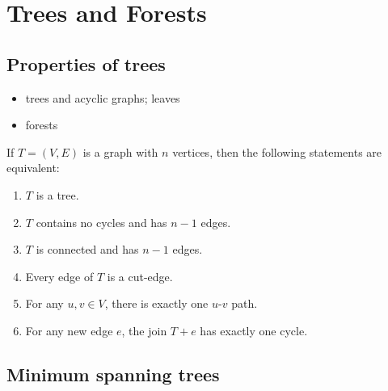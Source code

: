 
\chapter{Trees and Forests}



\section{Properties of trees}

\begin{itemize}
\item trees and acyclic graphs; leaves

\item forests
\end{itemize}

\begin{theorem}
If $T = (V, E)$ is a graph with $n$ vertices, then the following
statements are equivalent:
\begin{enumerate}
\item $T$ is a tree.

\item $T$ contains no cycles and has $n - 1$ edges.

\item $T$ is connected and has $n - 1$ edges.

\item Every edge of $T$ is a cut-edge.

\item For any $u,v \in V$, there is exactly one $u$-$v$ path.

\item For any new edge $e$, the join $T + e$ has exactly one cycle.
\end{enumerate}
\end{theorem}



\section{Minimum spanning trees}


